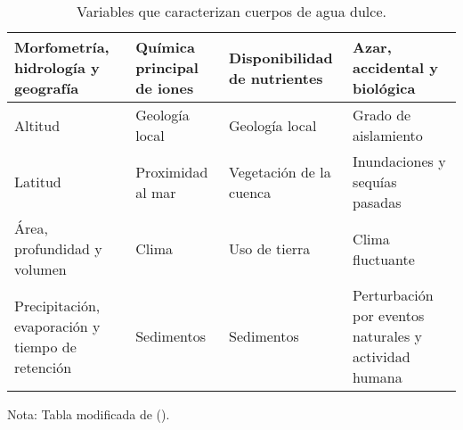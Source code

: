 \begin{table}[htbp]
	\centering
	\begin{threeparttable}
		\caption[Variables que caracterizan cuerpos de agua dulce.]{Variables que caracterizan cuerpos de agua dulce.}
		\label{tabla:variables_lagos}
		\begin{tabular}{ m{3.5cm}  m{3.5cm}  m{3.5cm}  m{3.5cm} }
			\hline
			\textbf{Morfometría, hidrología y geografía} & \textbf{Química principal de iones} & \textbf{Disponibilidad de nutrientes} & \textbf{Azar, accidental y biológica} \\
			\hline
			Altitud & Geología local & Geología local & Grado de aislamiento \\
			\hline
			Latitud & Proximidad al mar & Vegetación de la cuenca & Inundaciones y sequías pasadas \\
			\hline
			Área, profundidad y volumen & Clima & Uso de tierra & Clima fluctuante \\
			\hline
			Precipitación, evaporación y tiempo de retención & Sedimentos & Sedimentos & Perturbación por eventos naturales y actividad humana \\
			\hline
		\end{tabular}
		\begin{tablenotes}
			\item Nota: Tabla modificada de (\cite{adrian2009lakes}).
		\end{tablenotes}
	\end{threeparttable}
\end{table}

